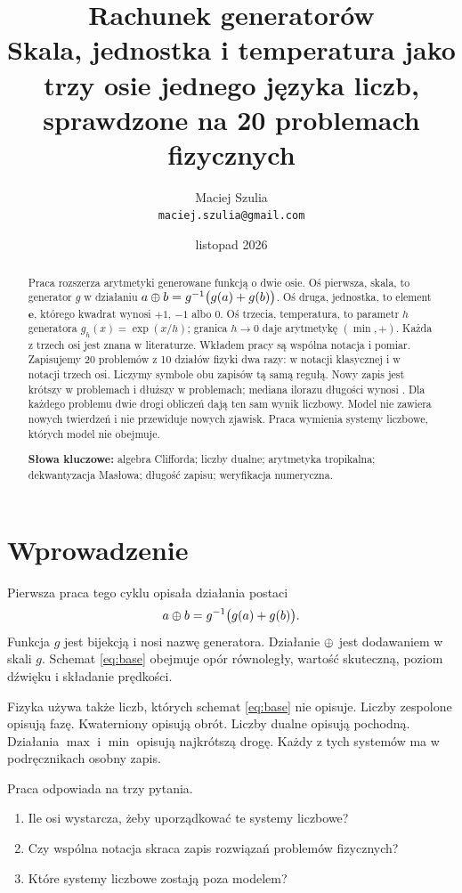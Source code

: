 \documentclass[11pt,a4paper]{article}
\title{\textbf{Rachunek generatorów}\\[2pt]
\large Skala, jednostka i temperatura jako trzy osie jednego języka liczb,\\
sprawdzone na 20 problemach fizycznych}
\author{Maciej Szulia\\[2pt]\normalsize\texttt{maciej.szulia@gmail.com}}
\date{listopad 2026}
\newcommand{\ue}{\mathbf{e}}                 %
\begin{document}
\maketitle

\begin{abstract}
\noindent
Praca rozszerza arytmetyki generowane funkcją \cite{szulia2026} o dwie osie.
Oś pierwsza, skala, to generator $g$ w działaniu
$a\mathbin{\oplus} b=g^{-1}\big(g(a)+g(b)\big)$. Oś druga, jednostka, to element $\ue$,
którego kwadrat wynosi $+1$, $-1$ albo $0$. Oś trzecia, temperatura, to parametr
$h$ generatora $g_h(x)=\exp(x/h)$; granica $h\to0$ daje arytmetykę $(\min,+)$.
Każda z trzech osi jest znana w literaturze. Wkładem pracy są wspólna notacja
i pomiar. Zapisujemy 20 problemów z 10 działów fizyki dwa razy: w notacji
klasycznej i w notacji trzech osi. Liczymy symbole obu zapisów tą samą regułą.
Nowy zapis jest krótszy w \gcShorter{} problemach i dłuższy w \gcLonger{}
problemach; mediana ilorazu długości wynosi \gcMedian. Dla każdego problemu dwie
drogi obliczeń dają ten sam wynik liczbowy. Model nie zawiera nowych twierdzeń
i nie przewiduje nowych zjawisk. Praca wymienia systemy liczbowe, których model
nie obejmuje.

\smallskip
\noindent\textbf{Słowa kluczowe:} algebra Clifforda; liczby dualne; arytmetyka
tropikalna; dekwantyzacja Masłowa; długość zapisu; weryfikacja numeryczna.
\end{abstract}

\section{Wprowadzenie}

Pierwsza praca tego cyklu \cite{szulia2026} opisała działania postaci
\begin{equation}
\label{eq:base}
a\mathbin{\oplus} b=g^{-1}\big(g(a)+g(b)\big).
\end{equation}
Funkcja $g$ jest bijekcją i nosi nazwę generatora. Działanie $\mathbin{\oplus}$ jest
dodawaniem w skali $g$. Schemat \eqref{eq:base} obejmuje opór równoległy,
wartość skuteczną, poziom dźwięku i składanie prędkości.

Fizyka używa także liczb, których schemat \eqref{eq:base} nie opisuje. Liczby
zespolone opisują fazę. Kwaterniony opisują obrót. Liczby dualne opisują
pochodną. Działania $\max$ i $\min$ opisują najkrótszą drogę. Każdy z tych
systemów ma w podręcznikach osobny zapis.

Praca odpowiada na trzy pytania.
\begin{enumerate}[label=(\roman*),leftmargin=2.2em]
  \item Ile osi wystarcza, żeby uporządkować te systemy liczbowe?
  \item Czy wspólna notacja skraca zapis rozwiązań problemów fizycznych?
  \item Które systemy liczbowe zostają poza modelem?
\end{enumerate}
\end{document}
